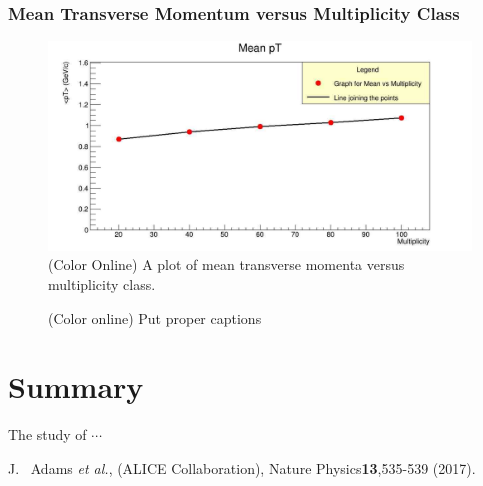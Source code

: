 \documentclass[letterpaper,aps,prc,superscriptaddress,nofootinbib,10pt,showpacs,floatfix]{revtex4-2}%
\begin{document}
\subsubsection{Mean Transverse Momentum versus Multiplicity Class}
\label{subsubsec:mean}
\vspace{-5mm}
\begin{figure}[!htb]
   \label{Fig:6}
     \centering
     \renewcommand{\thefigure}{6}
     \includegraphics[width=0.8\linewidth]{mean}
     \caption{(Color Online) A plot of mean transverse momenta versus multiplicity class.}
\end{figure}










\newpage
\begin{figure}
\begin{center}
\caption{(Color online) Put proper captions}
\label{f1}
\end{center}
\end{figure}









\section{Summary}

The study of  $\cdots$


\begin{thebibliography}{50}
\medskip


  
 J. ~Adams {\it et al.}, (ALICE Collaboration), Nature Physics{\bf 13},535-539 (2017). 


\end{thebibliography}
\end{document}
